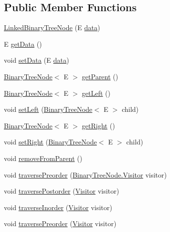 \subsection*{Public Member Functions}
\begin{DoxyCompactItemize}
\item 
\hyperlink{class_linked_binary_tree_node_a1852ddd1b7b716eede0a34aec4fb0f1c}{Linked\+Binary\+Tree\+Node} (E \hyperlink{class_linked_binary_tree_node_a9022368f5ebb23585ce2b00cdc27e505}{data})
\item 
E \hyperlink{class_linked_binary_tree_node_a7c2f77ce2d6b5b56854f3e21229cf7be}{get\+Data} ()
\item 
void \hyperlink{class_linked_binary_tree_node_ada54f092b78cc359f1ba41a3ac02ab80}{set\+Data} (E \hyperlink{class_linked_binary_tree_node_a9022368f5ebb23585ce2b00cdc27e505}{data})
\item 
\hyperlink{interface_binary_tree_node}{Binary\+Tree\+Node}$<$ E $>$ \hyperlink{class_linked_binary_tree_node_a67681eb2b9d5aa1522fe7f5ad0a43435}{get\+Parent} ()
\item 
\hyperlink{interface_binary_tree_node}{Binary\+Tree\+Node}$<$ E $>$ \hyperlink{class_linked_binary_tree_node_aff92f2fe5a957710d6510efba6c12a24}{get\+Left} ()
\item 
void \hyperlink{class_linked_binary_tree_node_ad99561d122c83c710d2e16acf6a78016}{set\+Left} (\hyperlink{interface_binary_tree_node}{Binary\+Tree\+Node}$<$ E $>$ child)
\item 
\hyperlink{interface_binary_tree_node}{Binary\+Tree\+Node}$<$ E $>$ \hyperlink{class_linked_binary_tree_node_a0d0979d4274a78b5e50cc67bbe67f6dd}{get\+Right} ()
\item 
void \hyperlink{class_linked_binary_tree_node_acf93e554937b4465b206145c2ad3cc25}{set\+Right} (\hyperlink{interface_binary_tree_node}{Binary\+Tree\+Node}$<$ E $>$ child)
\item 
void \hyperlink{class_linked_binary_tree_node_a8ad111432e731268c2a2f2b60b716c3c}{remove\+From\+Parent} ()
\item 
void \hyperlink{class_linked_binary_tree_node_afe88e26d8e1a35a9f9cfb885aa4cf7eb}{traverse\+Preorder} (\hyperlink{interface_binary_tree_node_1_1_visitor}{Binary\+Tree\+Node.\+Visitor} visitor)
\item 
void \hyperlink{class_linked_binary_tree_node_ae0280ad10046815632a7f41f4fbfc7c4}{traverse\+Postorder} (\hyperlink{interface_binary_tree_node_1_1_visitor}{Visitor} visitor)
\item 
void \hyperlink{class_linked_binary_tree_node_a7e0193ab373cea38b1144f0d13618e2e}{traverse\+Inorder} (\hyperlink{interface_binary_tree_node_1_1_visitor}{Visitor} visitor)
\item 
void \hyperlink{interface_binary_tree_node_a663a53b5d44f02f42c62aa8adaee09a1}{traverse\+Preorder} (\hyperlink{interface_binary_tree_node_1_1_visitor}{Visitor} visitor)
\end{DoxyCompactItemize}
